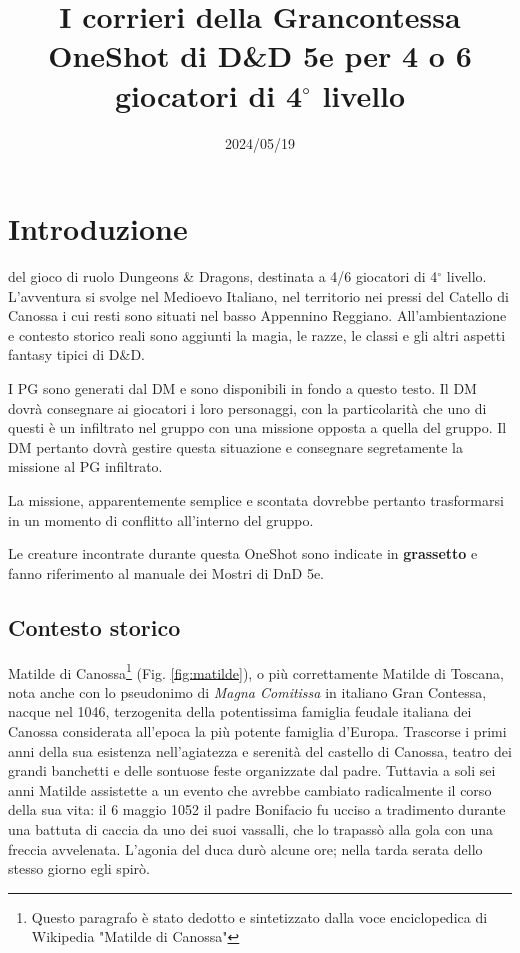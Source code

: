 \documentclass[letterpaper,twocolumn,openany,nodeprecatedcode]{dndbook}
\title{I corrieri della Grancontessa \\
\large OneShot di D\&D 5e per 4 o 6 giocatori di 4$^\circ$ livello}
\author{}
\date{2024/05/19}
\begin{document}
\frontmatter

\maketitle

\tableofcontents


\mainmatter%





\chapter{Introduzione}

 del gioco di ruolo Dungeons \& Dragons\cite{dnd:giocatore}, destinata a 4/6 giocatori di 4$^\circ$ livello. L'avventura si svolge nel Medioevo Italiano, nel territorio nei pressi del Catello di Canossa i cui resti sono situati nel basso Appennino Reggiano. All'ambientazione e contesto storico reali sono aggiunti la magia, le razze, le classi e gli altri aspetti fantasy tipici di D\&D.

I PG sono generati dal DM e sono disponibili in fondo a questo testo. Il DM dovrà consegnare ai giocatori i loro personaggi, con la particolarità che uno di questi è un infiltrato nel gruppo con una missione opposta a quella del gruppo. Il DM pertanto dovrà gestire questa situazione e consegnare segretamente la missione al PG infiltrato.

La missione, apparentemente semplice e scontata dovrebbe pertanto trasformarsi in un momento di conflitto all'interno del gruppo.

Le creature incontrate durante questa OneShot sono indicate in \textbf{grassetto} e fanno riferimento al manuale dei Mostri di DnD 5e\cite{dnd:mostri}.

\section{Contesto storico}


Matilde di Canossa\footnote{Questo paragrafo è stato dedotto e sintetizzato dalla voce enciclopedica di Wikipedia "Matilde di Canossa"} (Fig. \ref{fig:matilde})\cite{wiki:matilde}, o più correttamente Matilde di Toscana, nota anche con lo pseudonimo di \textit{Magna Comitissa} in italiano Gran Contessa, nacque nel 1046, terzogenita della potentissima famiglia feudale italiana dei Canossa considerata all'epoca la più potente famiglia d'Europa. Trascorse i primi anni della sua esistenza nell'agiatezza e serenità del castello di Canossa, teatro dei grandi banchetti e delle sontuose feste organizzate dal padre. Tuttavia a soli sei anni Matilde assistette a un evento che avrebbe cambiato radicalmente il corso della sua vita: il 6 maggio 1052 il padre Bonifacio fu ucciso a tradimento durante una battuta di caccia da uno dei suoi vassalli, che lo trapassò alla gola con una freccia avvelenata. L'agonia del duca durò alcune ore; nella tarda serata dello stesso giorno egli spirò.
\end{document}

